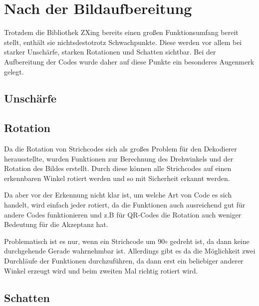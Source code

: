 \section{Nach der Bildaufbereitung}
\writtenby{\dcauthornameriren}%
Trotzdem die Bibliothek ZXing bereits einen großen Funktionsumfang bereit stellt, enthält sie nichtsdestotrotz Schwachpunkte. Diese werden vor allem bei starker Unschärfe, starken Rotationen und Schatten sichtbar.
Bei der Aufbereitung der Codes wurde daher auf diese Punkte ein besonderes Augenmerk gelegt.

\subsection*{Unschärfe}



\subsection*{Rotation}
Da die Rotation von Strichcodes sich als großes Problem für den Dekodierer herausstellte, wurden Funktionen zur Berechnung des Drehwinkels und der Rotation des Bildes erstellt. Durch diese können alle Strichcodes auf einen erkennbaren Winkel rotiert werden und so mit Sicherheit erkannt werden.

Da aber vor der Erkennung nicht klar ist, um welche Art von Code es sich handelt, wird einfach jeder rotiert, da die Funktionen auch ausreichend gut für andere Codes funktionieren und z.B für QR-Codes die Rotation auch weniger Bedeutung für die Akzeptanz hat.

Problematisch ist es nur, wenn ein Strichcode um 90$ \circ $ gedreht ist, da dann keine durchgehende Gerade wahrnehmbar ist. Allerdings gibt es da die Möglichkeit zwei Durchläufe der Funktionen durchzuführen, da dann erst ein beliebiger anderer Winkel erzeugt wird und beim zweiten Mal richtig rotiert wird.



\subsection*{Schatten}





